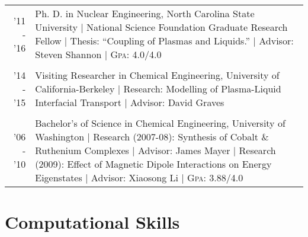 \documentclass[a4paper,10pt]{article} %
\newcounter{magicrownumbers}
\begin{document}
\begin{table}[h]
\begin{tabularx}{\textwidth}{rX}

\textsc{'11 - '16} & Ph. D. in Nuclear Engineering, North Carolina State University | National Science Foundation Graduate Research Fellow | Thesis: ``Coupling of Plasmas and Liquids.'' | Advisor: Steven Shannon | \textsc{Gpa}: 4.0/4.0\\
&\\


\textsc{'14 - '15} & Visiting Researcher in Chemical Engineering, University of California-Berkeley | Research: Modelling of Plasma-Liquid Interfacial Transport | Advisor: David Graves\\
&\\


\textsc{'06 - '10} & Bachelor's of Science in Chemical Engineering, University of Washington | Research (2007-08): Synthesis of Cobalt \& Ruthenium Complexes | Advisor: James Mayer | Research (2009): Effect of Magnetic Dipole Interactions on Energy Eigenstates | Advisor: Xiaosong Li | \textsc{Gpa}: 3.88/4.0\\

\end{tabularx}
\end{table}



\pagebreak


\setcounter{magicrownumbers}{0}



\FloatBarrier


\section{Computational Skills}
\end{document}
